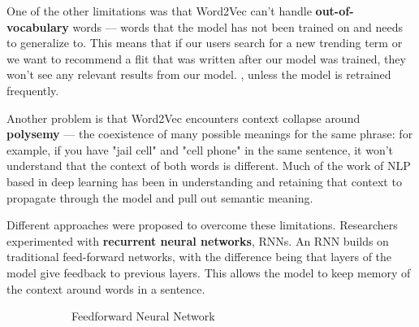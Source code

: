 \documentclass[11pt, table]{diazessay} %
\begin{document}
\begin{sloppypar}
One of the other limitations was that Word2Vec can't handle \textbf{out-of-vocabulary} words --- words that the model has not been trained on and needs to generalize to. This means that if our users search for a new trending term or we want to recommend a flit that was written after our model was trained, they won't see any relevant results from our model. \citep{di2021considerations}, unless the model is retrained frequently.

Another problem is that Word2Vec encounters context collapse around \textbf{polysemy} --- the coexistence of many possible meanings for the same phrase: for example, if you have "jail cell" and "cell phone" in the same sentence, it won't understand that the context of both words is different. Much of the work of NLP based in deep learning has been in understanding and retaining that context to propagate through the model and pull out semantic meaning.   

Different approaches were proposed to overcome these limitations. Researchers experimented with \textbf{recurrent neural networks}, RNNs. An RNN builds on traditional feed-forward networks, with the difference being that layers of the model give feedback to previous layers. This allows the model to keep memory of the context around words in a sentence.
 
\begin{figure}[H]
\centering
\begin{subfigure}[b]{0.4\linewidth}
\caption{Feedforward Neural Network}
\end{subfigure}
\begin{subfigure}[b]{0.4\linewidth}
\begin{tikzpicture}[
    shorten >=1pt,
    draw=black,
    node distance=2.5cm,line width=2pt,
    input/.style={draw=black, circle, fill=black!30, minimum size=1cm},
    cell/.style={draw=black, rectangle, rounded corners=3mm, minimum width=3cm,
        		 minimum height=1.5cm, fill=black!10},
    pre/.style={->},
    post/.style={<-}
    ]


\end{tikzpicture}
\end{subfigure}
\end{figure}
\end{sloppypar}
\end{document}
